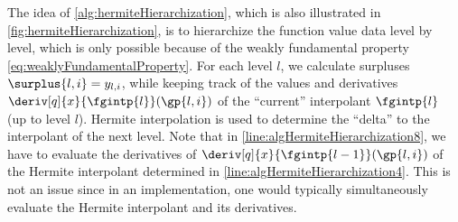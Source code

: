 \begin{algorithm}
\begin{algorithmic}[1]
            \label{line:algHermiteHierarchization8}
          \EndFor{}
        \EndFor{}
      \EndFor{}
    \EndFunction{}
  \end{algorithmic}
  \caption[%
    Hermite hierarchization%
  ]{%
    Hermite hierarchization on one-dimensional regular grids.
    Inputs are
    the vector $\vlinin = (\linin{l,i})_{(l,i) \in \liset}$
    of input data (function values $\fcnval{l,i}$ at the grid points) and
    the level $n$ of the regular grid,
    where $\liset = \{(l, i) \mid l = 0, \dotsc, n,\; i \in \hiset{l}\}$.
    The output is the vector
    $\vlinout = (\linout{l,i})_{(l,i) \in \liset}$
    of output data (hierarchical surpluses $\surplus{l,i}$).%
  }%
  \label{alg:hermiteHierarchization}%
\end{algorithm}

The idea of \cref{alg:hermiteHierarchization},
which is also illustrated in \cref{fig:hermiteHierarchization},
is to hierarchize the function value data level by level,
which is only possible because of the weakly fundamental property
\eqref{eq:weaklyFundamentalProperty}.
For each level $l$, we calculate surpluses
$\surplus{l,i} = \linout{l,i}$, while keeping track of
the values and derivatives
$\deriv[q]{x}{\fgintp{l}}(\gp{l,i})$ of the
``current'' interpolant $\fgintp{l}$ (up to level $l$).
Hermite interpolation is used to determine the ``delta''
to the interpolant of the next level.
Note that in \cref{line:algHermiteHierarchization8},
we have to evaluate the derivatives of
$\deriv[q]{x}{\fgintp{l-1}}(\gp{l,i})$ of the Hermite interpolant
determined in \cref{line:algHermiteHierarchization4}.
This is not an issue since in an implementation,
one would typically simultaneously evaluate the
Hermite interpolant and its derivatives.

